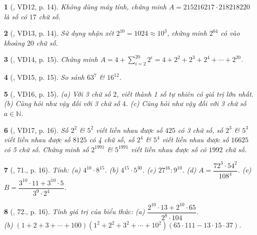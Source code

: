 \documentclass{article}
\newtheorem{baitoan}{}
\begin{document}
\begin{baitoan}[\cite{Binh_Toan_6_tap_1}, VD12, p. 14]
	Không dùng máy tính, chứng minh $A = 215216217\cdot218218220$ là số có $17$ chữ số.
\end{baitoan}

\begin{baitoan}[\cite{Binh_Toan_6_tap_1}, VD13, p. 14]
	Sử dụng nhận xét $2^{10} = 1024\approx10^3$, chứng minh $2^{64}$ có vào khoảng $20$ chữ số.
\end{baitoan}

\begin{baitoan}[\cite{Binh_Toan_6_tap_1}, VD14, p. 15]
	Chứng minh $A = 4 + \sum_{i=2}^{20} 2^i = 4 + 2^2 + 2^3 + 2^4 + \cdots + 2^{20}$.
\end{baitoan}

\begin{baitoan}[\cite{Binh_Toan_6_tap_1}, VD15, p. 15]
	So sánh $63^7$ \& $16^{12}$.
\end{baitoan}

\begin{baitoan}[\cite{Binh_Toan_6_tap_1}, VD16, p. 15]
	(a) Với 3 chữ số $2$, viết thành 1 số tự nhiên có giá trị lớn nhất. (b) Cũng hỏi như vậy đối với 3 chữ số $4$. (c) Cũng hỏi như vậy đối với 3 chữ số $a\in\mathbb{N}$.
\end{baitoan}

\begin{baitoan}[\cite{Binh_Toan_6_tap_1}, VD17, p. 16]
	Số $2^2$ \& $5^2$ viết liền nhau được số $425$ có 3 chữ số, số $2^3$ \& $5^3$ viết liền nhau được số $8125$ có 4 chữ số, số $2^4$ \& $5^4$ viết liền nhau được số $16625$ có 5 chữ số. Chứng minh số $2^{1991}$ \& $5^{1991}$ viết liền nhau được số có $1992$ chữ số.
\end{baitoan}

\begin{baitoan}[\cite{Binh_Toan_6_tap_1}, 71., p. 16]
	Tính: (a) $4^{10}\cdot8^{15}$. (b) $4^{15}\cdot5^{30}$. (c) $27^{16}:9^{10}$. (d) $A = \dfrac{72^3\cdot54^2}{108^4}$. (e) $B = \dfrac{3^{10}\cdot11 + 3^{10}\cdot5}{3^9\cdot2^4}$.
\end{baitoan}

\begin{baitoan}[\cite{Binh_Toan_6_tap_1}, 72., p. 16]
	Tính giá trị của biểu thức: (a) $\dfrac{2^{10}\cdot13 + 2^{10}\cdot65}{2^8\cdot104}$.\\(b) $(1 + 2 + 3 + \cdots + 100)(1^2 + 2^2 + 3^2 + \cdots + 10^2)(65\cdot111 - 13\cdot15\cdot37)$.
\end{baitoan}
\end{document}
